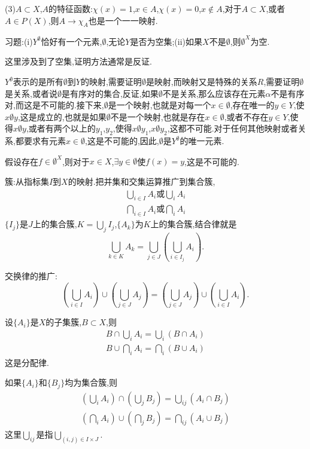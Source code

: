 \documentclass[12pt,a4paper,openany]{book}
\begin{document}
(3)$A \subset X$,$A$的特征函数:$\chi(x)=1$,$x \in A$,$\chi(x)=0$,$x \notin A$,对于$A \subset X$,或者$A \in P(X)$,则$A \to \chi_A$也是一个一一映射.

习题:(i)$Y^{\emptyset}$恰好有一个元素,$\emptyset$,无论$Y$是否为空集;(ii)如果$X$不是$\emptyset$,则$\emptyset^X$为空.

这里涉及到了空集,证明方法通常是反证.

$Y^{\emptyset}$表示的是所有$\emptyset$到$Y$的映射,需要证明$\emptyset$是映射,而映射又是特殊的关系$R$,需要证明$\emptyset$是关系,或者说$\emptyset$是有序对的集合,反证,如果$\emptyset$不是关系,那么应该存在元素$\alpha$不是有序对,而这是不可能的.接下来,$\emptyset$是一个映射,也就是对每一个$x \in \emptyset$,存在唯一的$y \in Y$,使$x\emptyset{}y$,这是成立的,也就是如果$\emptyset$不是一个映射,也就是存在$x \in \emptyset$,或者不存在$y \in Y$,使得$x \emptyset y$,或者有两个以上的$y_1$,$y_2$,使得$x \emptyset y_1$,$x \emptyset y_2$,这都不可能.对于任何其他映射或者关系,都要求有元素$x \in \emptyset$,这是不可能的,因此,$\emptyset$是$Y^{\emptyset}$的唯一元素.

假设存在$f \in \emptyset^X$,则对于$x \in X$,$\exists y \in \emptyset$使$f(x)=y$,这是不可能的.

簇:从指标集$I$到$X$的映射.把并集和交集运算推广到集合簇,
\begin{gather*}
\bigcup_{i \in I}{A_i} \text{或} \bigcup_{i}{A_i}\\
\bigcap_{i \in I}{A_i} \text{或} \bigcap_{i}{A_i}
\end{gather*}
$\{I_j\}$是$J$上的集合簇,$K=\bigcup_{j}{I_j}$,$\{A_k\}$为$K$上的集合簇,结合律就是
\[
\bigcup_{k \in K}{A_k} = \bigcup_{j \in J}{(\bigcup_{i \in I_j}{A_i})}.
\]

交换律的推广:
\[
(\bigcup_{i \in I}{A_i}) \cup (\bigcup_{j \in J}{A_j}) = (\bigcup_{j \in J}{A_j}) \cup (\bigcup_{i \in I}{A_i}).
\]

设$\{A_i\}$是$X$的子集簇,$B \subset X$,则
\begin{gather*}
B \cap \bigcup_{i}{A_i} = \bigcup_{i}{(B \cap A_i)} \\
B \cup \bigcap_{i}{A_i} = \bigcap_{i}{(B \cup A_i)}
\end{gather*}
这是分配律.

如果$\{A_i\}$和$\{B_j\}$均为集合簇,则
\begin{gather*}
(\bigcup_{i}{A_i}) \cap (\bigcup_{j}{B_j}) = \bigcup_{ij}{(A_i \cap B_j)} \\
(\bigcap_{i}{A_i}) \cup (\bigcap_{j}{B_j}) = \bigcap_{ij}{(A_i \cup B_j)}
\end{gather*}
这里$\bigcup_{ij}$是指$\bigcup_{(i,j) \in I \times J}$.
\end{document}
